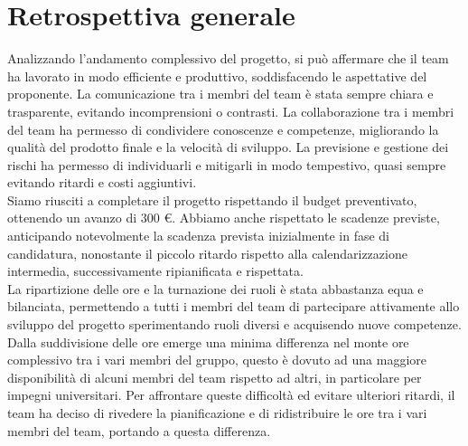 \section{Retrospettiva generale}
Analizzando l'andamento complessivo del progetto, si può affermare che il team ha lavorato in modo efficiente e produttivo, soddisfacendo le aspettative del proponente. La comunicazione tra i membri del team è stata sempre chiara e trasparente, evitando incomprensioni o contrasti. La collaborazione tra i membri del team ha permesso di condividere conoscenze e competenze, migliorando la qualità del prodotto finale e la velocità di sviluppo. La previsione e gestione dei rischi ha permesso di individuarli e mitigarli in modo tempestivo, quasi sempre evitando ritardi e costi aggiuntivi. \\
Siamo riusciti a completare il progetto rispettando il budget preventivato, ottenendo un avanzo di 300 €. Abbiamo anche rispettato le scadenze previste, anticipando notevolmente la scadenza prevista inizialmente in fase di candidatura, nonostante il piccolo ritardo rispetto alla calendarizzazione intermedia, successivamente ripianificata e rispettata. \\
La ripartizione delle ore e la turnazione dei ruoli è stata abbastanza equa e bilanciata, permettendo a tutti i membri del team di partecipare attivamente allo sviluppo del progetto sperimentando ruoli diversi e acquisendo nuove competenze. Dalla suddivisione delle ore emerge una minima differenza nel monte ore complessivo tra i vari membri del gruppo, questo è dovuto ad una maggiore disponibilità di alcuni membri del team rispetto ad altri, in particolare per impegni universitari. Per affrontare queste difficoltà ed evitare ulteriori ritardi, il team ha deciso di rivedere la pianificazione e di ridistribuire le ore tra i vari membri del team, portando a questa differenza.

